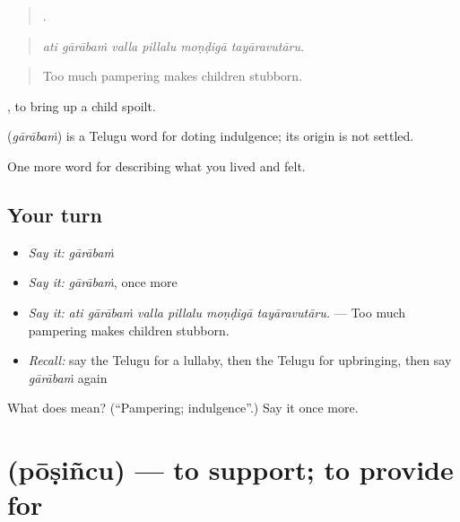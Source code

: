 \begin{quote}
     .
\end{quote}

\begin{quote}
\emph{ati gārābaṁ valla pillalu moṇḍigā tayāravutāru.}
\end{quote}

\begin{quote}
Too much pampering makes children stubborn.
\end{quote}

 , to bring up a child spoilt.

\begin{cousinweb}
\textbf{} (\emph{gārābaṁ}) is a Telugu word for doting indulgence; its origin is not settled.
\end{cousinweb}

\begin{grammarlens}[title={What you've built}]
One more word for describing what you lived and felt.
\end{grammarlens}

\subsection*{Your turn}
\begin{itemize}
\raggedright
  \item \emph{Say it:} \emph{gārābaṁ}
  \item \emph{Say it:} \emph{gārābaṁ}, once more
  \item \emph{Say it:} \emph{ati gārābaṁ valla pillalu moṇḍigā tayāravutāru.} — Too much pampering makes children stubborn.
  \item \emph{Recall:} say the Telugu for a lullaby, then the Telugu for upbringing, then say \emph{gārābaṁ} again
\end{itemize}

\begin{tcolorbox}[breakable,colback=teal!4,colframe=teal!35!black,title={Before you move on}]
What does  mean? (\textquotedblleft{}Pampering; indulgence\textquotedblright{}.) Say it once more.
\end{tcolorbox}
\section[\texorpdfstring{\te{పోషించు} (pōṣiñcu)}{పోషించు (pōṣiñcu)}]{ (pōṣiñcu) — to support; to provide for}

